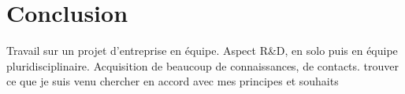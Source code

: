\documentclass{beamer}
\begin{document}
	\section{Conclusion}
		\begin{frame}
			Travail sur un projet d'entreprise en équipe.
			Aspect R\&D, en solo puis en équipe pluridisciplinaire.
			Acquisition de beaucoup de connaissances, de contacts.
			trouver ce que je suis venu chercher en accord avec mes principes et souhaits
		\end{frame}
		
\end{document}
